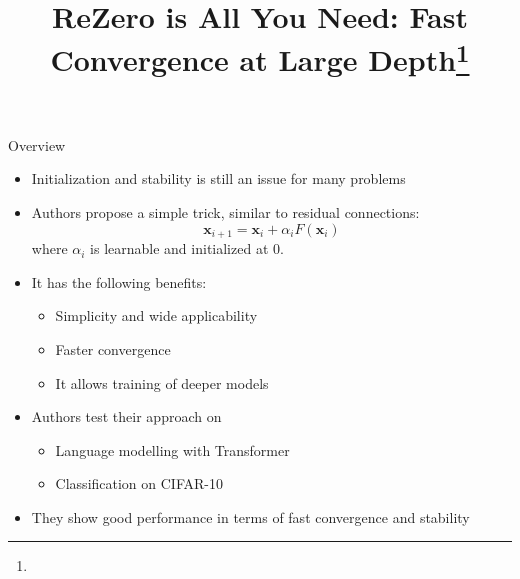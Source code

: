 \documentclass[handout, 10pt]{beamer}
\title{ReZero is All You Need: Fast Convergence at Large Depth\footnote{\citepaper{ReZero}}}
\begin{document}
\begin{frame}
    \titlepage
\end{frame}

\begin{frame}{Overview}
\begin{itemize}
    \item\pause Initialization and stability is still an issue for many problems
    \item\pause Authors propose a simple trick, similar to residual connections:
\begin{equation}
\boldsymbol{x}_{i+1}=\boldsymbol{x}_{i}+\alpha_{i} F\left(\boldsymbol{x}_{i}\right)
\end{equation}
    where $\alpha_i$ is learnable and initialized at 0.
    \item\pause It has the following benefits:
    \begin{itemize}
        \item\pause Simplicity and wide applicability
        \item\pause Faster convergence
        \item\pause It allows training of deeper models
    \end{itemize}
    \item\pause Authors test their approach on
    \begin{itemize}
        \item\pause Language modelling with Transformer
        \item\pause Classification on CIFAR-10
    \end{itemize}
    \item\pause They show good performance in terms of fast convergence and stability
\end{itemize}
\end{frame}


\end{document}
